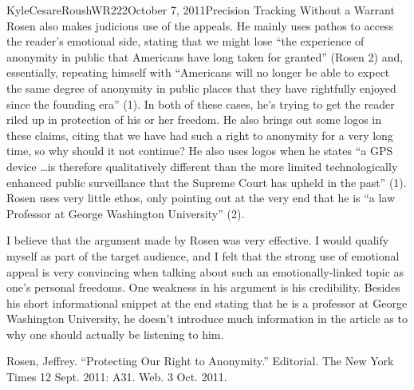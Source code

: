 \documentclass[12pt,letterpaper]{article}
\begin{document}
\begin{mla}{Kyle}{Cesare}{Roush}{WR222}{October 7, 2011}{Precision Tracking
Without a Warrant}
Rosen also makes judicious use of the appeals.  He mainly uses pathos to access
the reader's emotional side, stating that we might lose ``the experience of
anonymity in public that Americans have long taken for granted'' (Rosen 2) and,
essentially, repeating himself with ``Americans will no longer be able to expect
the same degree of anonymity in public places that they have rightfully enjoyed
since the founding era'' (1).  In both of these cases, he's trying to get the
reader riled up in protection of his or her freedom.  He also brings out some
logos in these claims, citing that we have had such a right to anonymity for a
very long time, so why should it not continue?  He also uses logos when he
states ``a GPS device \dots is therefore qualitatively different than the more
limited technologically enhanced public surveillance that the Supreme Court has
upheld in the past'' (1).  Rosen uses very little ethos, only pointing out at
the very end that he is ``a law Professor at George Washington University'' (2).

I believe that the argument made by Rosen was very effective.  I would qualify
myself as part of the target audience, and I felt that the strong use of
emotional appeal is very convincing when talking about such an
emotionally-linked topic as one's personal freedoms.  One weakness in his
argument is his credibility.  Besides his short informational snippet at the end
stating that he is a professor at George Washington University, he doesn't
introduce much information in the article as to why one should actually be
listening to him.

\begin{workscited}

\bibent Rosen, Jeffrey. ``Protecting Our Right to Anonymity.'' Editorial. The
New York Times 12 Sept. 2011: A31. Web. 3 Oct. 2011. 

\end{workscited}
\end{mla}
\end{document}
